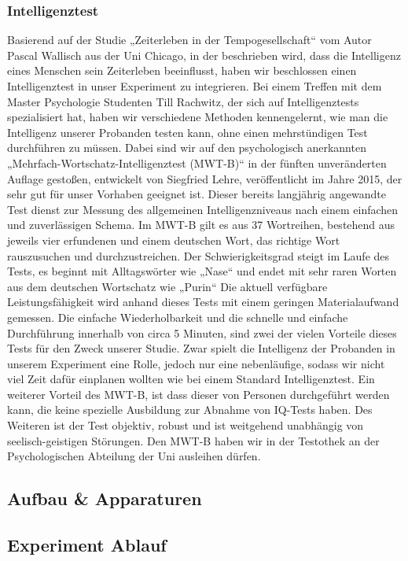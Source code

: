 \documentclass{Bericht}
\begin{document}
\subsubsection*{Intelligenztest}
Basierend auf der Studie „Zeiterleben in der Tempogesellschaft“ vom Autor Pascal Wallisch aus
der Uni Chicago, in der beschrieben wird, dass die Intelligenz eines Menschen sein Zeiterleben
beeinflusst, haben wir beschlossen einen Intelligenztest in unser Experiment zu integrieren. Bei
einem Treffen mit dem Master Psychologie Studenten Till Rachwitz, der sich auf Intelligenztests
spezialisiert hat, haben wir verschiedene Methoden kennengelernt, wie man die Intelligenz unserer
Probanden testen kann, ohne einen mehrstündigen Test durchführen zu müssen. Dabei
sind wir auf den psychologisch anerkannten „Mehrfach-Wortschatz-Intelligenztest (MWT-B)“ in
der fünften unveränderten Auflage gestoßen, entwickelt von Siegfried Lehre, veröffentlicht im
Jahre 2015, der sehr gut für unser Vorhaben geeignet ist. Dieser bereits langjährig angewandte
Test dienst zur Messung des allgemeinen Intelligenzniveaus nach einem einfachen und zuverlässigen
Schema.
Im MWT-B gilt es aus 37 Wortreihen, bestehend aus jeweils vier erfundenen und einem deutschen
Wort, das richtige Wort rauszusuchen und durchzustreichen. Der Schwierigkeitsgrad
steigt im Laufe des Tests, es beginnt mit Alltagswörter wie „Nase“ und endet mit sehr raren
Worten aus dem deutschen Wortschatz wie „Purin“ Die aktuell verfügbare Leistungsfähigkeit wird anhand dieses Tests mit einem geringen Materialaufwand
gemessen. Die einfache Wiederholbarkeit und die schnelle und einfache Durchführung
innerhalb von circa 5 Minuten, sind zwei der vielen Vorteile dieses Tests für den Zweck
unserer Studie. Zwar spielt die Intelligenz der Probanden in unserem Experiment eine Rolle,
jedoch nur eine nebenläufige, sodass wir nicht viel Zeit dafür einplanen wollten wie bei einem
Standard Intelligenztest. Ein weiterer Vorteil des MWT-B, ist dass dieser von Personen durchgeführt
werden kann, die keine spezielle Ausbildung zur Abnahme von IQ-Tests haben. Des
Weiteren ist der Test objektiv, robust und ist weitgehend unabhängig von seelisch-geistigen
Störungen.
Den MWT-B haben wir in der Testothek an der Psychologischen Abteilung der Uni ausleihen
dürfen.
	\subsection{Aufbau \& Apparaturen}
	\subsection{Experiment Ablauf}
\end{document}
